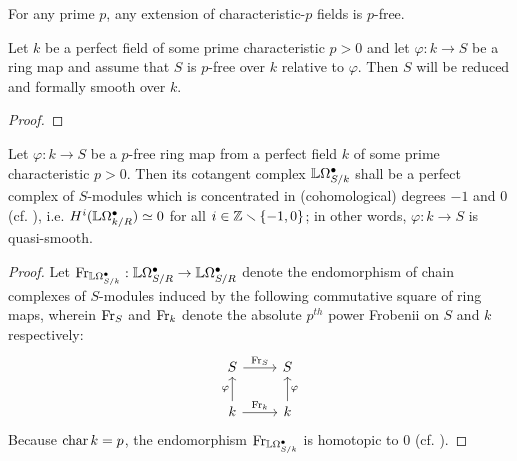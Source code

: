             \begin{corollary} \label{coro: field_extensions_of_characteristic_p_are_p_free}
                For any prime $p$, any extension of characteristic-$p$ fields is $p$-free.
            \end{corollary}
            \begin{proposition} \label{prop: p_free_algebras_are_reduced_and_formally_smooth}
                Let $k$ be a perfect field of some prime characteristic $p > 0$ and let $\varphi: k \to S$ be a ring map and assume that $S$ is $p$-free over $k$ relative to $\varphi$. Then $S$ will be reduced and formally smooth over $k$.
            \end{proposition}
                \begin{proof}
                    
                \end{proof}
            \begin{corollary} \label{coro: p_free_algebras_are_quasi_smooth}
                Let $\varphi: k \to S$ be a $p$-free ring map from a perfect field $k$ of some prime characteristic $p > 0$. Then its cotangent complex $\mathbb{L}\Omega^{\bullet}_{S/k}$ shall be a perfect complex of $S$-modules which is concentrated in (cohomological) degrees $-1$ and $0$ (cf. \cite[\href{https://stacks.math.columbia.edu/tag/08SL}{Tag 08SL}]{stacks}), i.e. $H^i(\mathbb{L}\Omega^{\bullet}_{k/R}) \simeq 0$ for all $i \in \mathbb{Z} \smallsetminus \{-1, 0\}$; in other words, $\varphi: k \to S$ is quasi-smooth.
            \end{corollary}
                \begin{proof}
                    Let $\mathrm{Fr}_{\mathbb{L}\Omega^{\bullet}_{S/k}}: \mathbb{L}\Omega^{\bullet}_{S/R} \to \mathbb{L}\Omega^{\bullet}_{S/R}$ denote the endomorphism of chain complexes of $S$-modules induced by the following commutative square of ring maps, wherein $\mathrm{Fr}_S$ and $\mathrm{Fr}_k$ denote the absolute $p^{th}$ power Frobenii on $S$ and $k$ respectively:
                        $$
                            \begin{tikzcd}
                            	S & S \\
                            	k & k
                            	\arrow["\varphi", from=2-1, to=1-1]
                            	\arrow["\varphi"', from=2-2, to=1-2]
                            	\arrow["{\Frob_S}", from=1-1, to=1-2]
                            	\arrow["{\Frob_k}", from=2-1, to=2-2]
                            \end{tikzcd}
                        $$
                    Because $\operatorname{char} k = p$, the endomorphism $\mathrm{Fr}_{\mathbb{L}\Omega^{\bullet}_{S/k}}$ is homotopic to $0$ (cf. \cite[\href{https://stacks.math.columbia.edu/tag/0G5Z}{Tag 0G5Z}]{stacks}).
                \end{proof}
